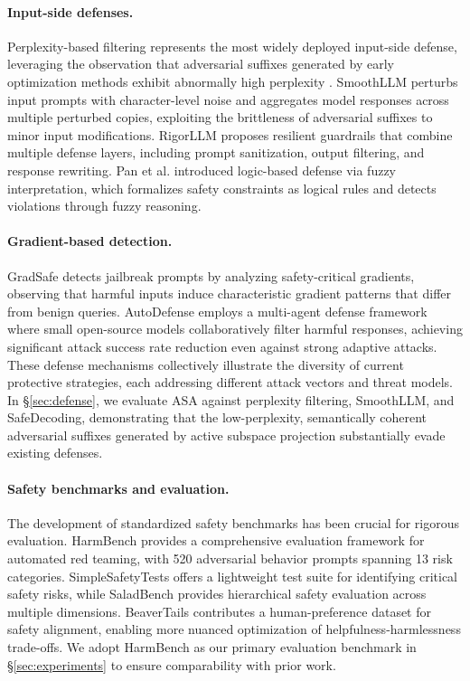 \documentclass[preprint,12pt]{elsarticle}
\begin{document}
\paragraph{Input-side defenses.} Perplexity-based filtering represents the most widely deployed input-side defense, leveraging the observation that adversarial suffixes generated by early optimization methods exhibit abnormally high perplexity \cite{zhu2023autodan}. SmoothLLM \cite{robey2023smoothllm} perturbs input prompts with character-level noise and aggregates model responses across multiple perturbed copies, exploiting the brittleness of adversarial suffixes to minor input modifications. RigorLLM \cite{yuan2024rigorllm} proposes resilient guardrails that combine multiple defense layers, including prompt sanitization, output filtering, and response rewriting. Pan et al. \cite{pan2024logic} introduced logic-based defense via fuzzy interpretation, which formalizes safety constraints as logical rules and detects violations through fuzzy reasoning.

\paragraph{Gradient-based detection.} GradSafe \cite{xie2024gradsafe} detects jailbreak prompts by analyzing safety-critical gradients, observing that harmful inputs induce characteristic gradient patterns that differ from benign queries. AutoDefense \cite{zeng2024autodefense} employs a multi-agent defense framework where small open-source models collaboratively filter harmful responses, achieving significant attack success rate reduction even against strong adaptive attacks. These defense mechanisms collectively illustrate the diversity of current protective strategies, each addressing different attack vectors and threat models. In \S\ref{sec:defense}, we evaluate ASA against perplexity filtering, SmoothLLM, and SafeDecoding, demonstrating that the low-perplexity, semantically coherent adversarial suffixes generated by active subspace projection substantially evade existing defenses.

\paragraph{Safety benchmarks and evaluation.} The development of standardized safety benchmarks has been crucial for rigorous evaluation. HarmBench \cite{mazeika2024harmbench} provides a comprehensive evaluation framework for automated red teaming, with 520 adversarial behavior prompts spanning 13 risk categories. SimpleSafetyTests \cite{vidgen2023simple} offers a lightweight test suite for identifying critical safety risks, while SaladBench \cite{li2024saladbench} provides hierarchical safety evaluation across multiple dimensions. BeaverTails \cite{ji2023beavertails} contributes a human-preference dataset for safety alignment, enabling more nuanced optimization of helpfulness-harmlessness trade-offs. We adopt HarmBench as our primary evaluation benchmark in \S\ref{sec:experiments} to ensure comparability with prior work.
\end{document}
